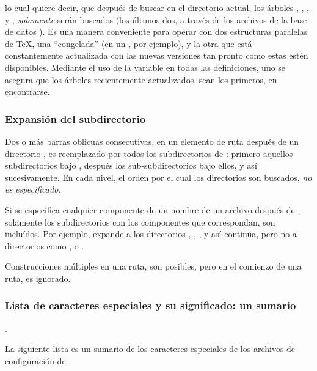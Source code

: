 \documentclass{article}
\begin{document}
lo cual quiere decir, que después de buscar en el directorio
actual, los árboles ,
, , y
, \emph{solamente} serán buscados (los
últimos dos, a través de los archivos de la base de datos
). Es una manera conveniente para operar con dos
estructuras paralelas de \TeX{}, una ``congelada'' (en un \CD,
por ejemplo), y la otra que está constantemente actualizada
con las nuevas versiones tan pronto como estas estén disponibles.
Mediante el uso de la variable  en todas las
definiciones, uno se asegura que los árboles recientemente
actualizados, sean los primeros, en encontrarse. 

\subsubsection{Expansión del subdirectorio}
\label{sec:subdirectory-expnsion}

Dos o más barras oblicuas consecutivas, en un elemento de ruta después de un
directorio , es reemplazado por todos los subdirectorios de
: primero aquellos subdirectorios bajo , después los
sub-subdirectorios bajo ellos, y así sucesivamente. En cada nivel, el orden
por el cual los directorios son buscados, \emph{no es especificado}.

Si se especifica cualquier componente de un nombre de un archivo después
de \samp{//}, solamente los subdirectorios con los componentes que
correspondan, son incluídos. Por ejemplo,  expande a los
directorios , , , y así
continúa, pero no a directorios como , o .

Construcciones múltiples \samp{//} en una ruta, son posibles, pero
\samp{//} en el comienzo de una ruta, es ignorado. 

\subsubsection{Lista de caracteres especiales y su significado: un
sumario}.

La siguiente lista es un sumario de los caracteres especiales de los
archivos de configuración de \KPS{}.
\end{document}
